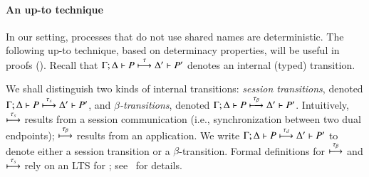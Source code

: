 \documentclass[runningheads]{llncs}
\begin{document}
{%
%
%
%


\paragraph{An up-to technique}
In our setting, processes that do not use shared names are deterministic. 
The following up-to technique, based on determinacy properties, will be useful in proofs ().
Recall that $\Gamma; \Delta \vdash P \stackrel{\tau}{\longmapsto} \Delta' \vdash P'$ denotes an internal (typed) transition.
 
 \begin{notation}
 \label{not:dettrans}
We shall distinguish two kinds of  internal transitions:
\emph{session transitions}, denoted 
$\Gamma; \Delta \vdash P \stackrel{\tau_{s}}{\longmapsto} \Delta' \vdash P'$,
and 
\emph{$\beta$-transitions}, denoted $\Gamma; \Delta \vdash P \stackrel{\tau_{\beta}}{\longmapsto} \Delta' \vdash P'$.
Intuitively, $\stackrel{\tau_{s}}{\longmapsto}$  results from a session communication (i.e., synchronization between
two dual endpoints); 
  $\stackrel{\tau_{\beta}}{\longmapsto}$ results from an application. 
 We write  $\Gamma; \Delta \vdash P \stackrel{\tau_{d}}{\longmapsto} \Delta' \vdash P'$ to denote
	either a session transition or a $\beta$-transition.
	Formal definitions for $\stackrel{\tau_{\beta}}{\longmapsto}$  and $\stackrel{\tau_{s}}{\longmapsto}$ rely on an LTS for \HOp; see~\cite{KouzapasPY15} for details.
 \end{notation}
 
}
\end{document}
